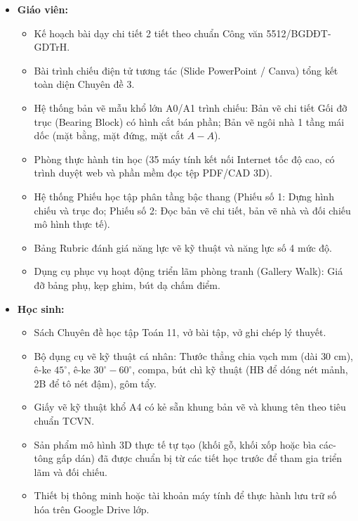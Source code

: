 \documentclass[12pt, a4paper]{article}
\begin{document}
\begin{itemize}[leftmargin=1.2cm]
    \item \textbf{Giáo viên:}
    \begin{itemize}[leftmargin=0.6cm]
        \item Kế hoạch bài dạy chi tiết 2 tiết theo chuẩn Công văn 5512/BGDĐT-GDTrH.
        \item Bài trình chiếu điện tử tương tác (Slide PowerPoint / Canva) tổng kết toàn diện Chuyên đề 3.
        \item Hệ thống bản vẽ mẫu khổ lớn A0/A1 trình chiếu: Bản vẽ chi tiết Gối đỡ trục (Bearing Block) có hình cắt bán phần; Bản vẽ ngôi nhà 1 tầng mái dốc (mặt bằng, mặt đứng, mặt cắt $A-A$).
        \item Phòng thực hành tin học (35 máy tính kết nối Internet tốc độ cao, có trình duyệt web và phần mềm đọc tệp PDF/CAD 3D).
        \item Hệ thống Phiếu học tập phân tầng bậc thang (Phiếu số 1: Dựng hình chiếu và trục đo; Phiếu số 2: Đọc bản vẽ chi tiết, bản vẽ nhà và đối chiếu mô hình thực tế).
        \item Bảng Rubric đánh giá năng lực vẽ kỹ thuật và năng lực số 4 mức độ.
        \item Dụng cụ phục vụ hoạt động triển lãm phòng tranh (Gallery Walk): Giá đỡ bảng phụ, kẹp ghim, bút dạ chấm điểm.
    \end{itemize}
    \item \textbf{Học sinh:}
    \begin{itemize}[leftmargin=0.6cm]
        \item Sách Chuyên đề học tập Toán 11, vở bài tập, vở ghi chép lý thuyết.
        \item Bộ dụng cụ vẽ kỹ thuật cá nhân: Thước thẳng chia vạch mm (dài $30\text{ cm}$), ê-ke $45^\circ$, ê-ke $30^\circ - 60^\circ$, compa, bút chì kỹ thuật (HB để dóng nét mảnh, 2B để tô nét đậm), gôm tẩy.
        \item Giấy vẽ kỹ thuật khổ A4 có kẻ sẵn khung bản vẽ và khung tên theo tiêu chuẩn TCVN.
        \item Sản phẩm mô hình 3D thực tế tự tạo (khối gỗ, khối xốp hoặc bìa các-tông gấp dán) đã được chuẩn bị từ các tiết học trước để tham gia triển lãm và đối chiếu.
        \item Thiết bị thông minh hoặc tài khoản máy tính để thực hành lưu trữ số hóa trên Google Drive lớp.
    \end{itemize}
\end{itemize}
\end{document}
